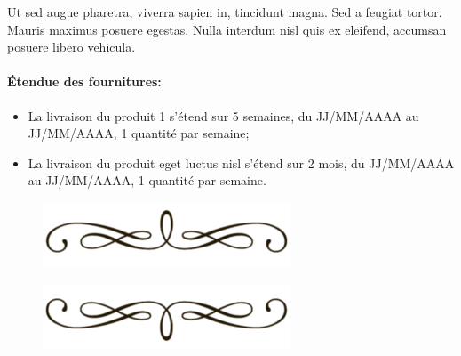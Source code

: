 \documentclass[a4paper,10pt]{article}
\begin{document}
Ut sed augue pharetra, viverra sapien in, tincidunt magna. Sed a feugiat tortor. Mauris maximus posuere egestas. Nulla interdum nisl quis ex eleifend, accumsan posuere libero vehicula. 

\paragraph*{\'{E}tendue des fournitures:}
\begin{itemize}
    \item La livraison du produit 1 s'étend sur 5 semaines, du JJ/MM/AAAA au JJ/MM/AAAA, 1 quantité par semaine;
    \item La livraison du produit eget luctus nisl s'étend sur 2 mois, du JJ/MM/AAAA au JJ/MM/AAAA, 1 quantité par semaine.
\end{itemize}



\rsfbCredit{}


\begin{figure}[t]
\begin{center}
\includegraphics[scale=0.3]{line_haut.png}
\end{center}
\end{figure}


\begin{figure}[b]
\begin{center}
\includegraphics[scale=0.3]{line_bas.png}
\end{center}
\end{figure}
\end{document}
